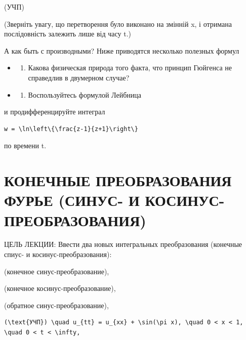 \documentclass[
  ukrainian,
]{article}
\providecommand{\tightlist}{%
  \setlength{\itemsep}{0pt}\setlength{\parskip}{0pt}}
\begin{document}
(УЧП)

(Зверніть увагу, що перетворення було виконано на змінній x, і отримана
послідовність залежить лише від часу t.)

А как быть с производными? Ниже приводятся несколько полезных формул

\begin{itemize}
\tightlist
\item
  \begin{enumerate}
  \def\labelenumi{\arabic{enumi}.}
  \setcounter{enumi}{5}
  \tightlist
  \item
    Какова физическая природа того факта, что принцип Гюйгенса не
    справедлив в двумерном случае?
  \end{enumerate}
\item
  \begin{enumerate}
  \def\labelenumi{\arabic{enumi}.}
  \setcounter{enumi}{6}
  \tightlist
  \item
    Воспользуйтесь формулой Лейбница
  \end{enumerate}
\end{itemize}

и продифференцируйте интеграл

\begin{verbatim}
w = \ln\left\{\frac{z-1}{z+1}\right\}
\end{verbatim}

по времени t.

\section{КОНЕЧНЫЕ ПРЕОБРАЗОВАНИЯ ФУРЬЕ (СИНУС- И
КОСИНУС-ПРЕОБРАЗОВАНИЯ)}\label{ux43aux43eux43dux435ux447ux43dux44bux435-ux43fux440ux435ux43eux431ux440ux430ux437ux43eux432ux430ux43dux438ux44f-ux444ux443ux440ux44cux435-ux441ux438ux43dux443ux441--ux438-ux43aux43eux441ux438ux43dux443ux441-ux43fux440ux435ux43eux431ux440ux430ux437ux43eux432ux430ux43dux438ux44f}

ЦЕЛЬ ЛЕКЦИИ: Ввести два новых интегральных преобразования (конечные
спиус- и косинус-преобразования):

(конечное синус-преобразование),

(конечное косинус-преобразование),

(обратное синус-преобразование),

\begin{verbatim}
(\text{УЧП}) \quad u_{tt} = u_{xx} + \sin(\pi x), \quad 0 < x < 1, \quad 0 < t < \infty,
\end{verbatim}
\end{document}
